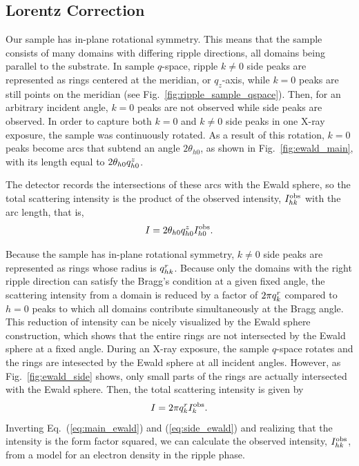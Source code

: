 \subsection{Lorentz Correction}\label{sec:Lorentz_correction}
Our sample has in-plane rotational symmetry. This means that the sample 
consists of many domains with differing ripple directions, all domains
being parallel to the substrate.  
In sample $q$-space, ripple $k\neq 0$ side peaks are represented as rings 
centered at the meridian, or $q_z$-axis, 
while $k=0$ peaks are still points on the meridian 
(see Fig.~\ref{fig:ripple_sample_qspace}). 
Then, for an arbitrary incident angle, $k=0$ peaks are not observed
while side peaks are observed. 
In order to capture both $k=0$ and $k\neq 0$ side peaks in one X-ray exposure, 
the sample was continuously rotated. As a result of this rotation, 
$k=0$ peaks become arcs that subtend an angle $2\theta_{h0}$,
as shown in Fig.~\ref{fig:ewald_main}, with its length
equal to $2\theta_{h0}q_{h0}^z$.  

The detector records the intersections of these arcs with the 
Ewald sphere, so the total scattering intensity is the product of the observed intensity,
$I_{hk}^\mathrm{obs}$ with the arc length, that is, 
\begin{equation}
  I = 2\theta_{h0}q_{h0}^z I_{h0}^\mathrm{obs}. \label{eq:main_ewald}
\end{equation}

Because the sample has in-plane rotational symmetry, $k\neq 0$
side peaks are represented as
rings whose radius is $q_{hk}^r$. 
Because only the domains
with the right ripple direction can satisfy the Bragg's condition at a given fixed
angle, the scattering intensity from a domain is reduced by 
a factor of $2\pi q_{k}^r$ compared to $h=0$ peaks to which all domains
contribute simultaneously at the Bragg angle.
This reduction of intensity can be nicely visualized by the Ewald sphere construction,
which shows that the entire rings are not intersected by the Ewald sphere at 
a fixed angle.  
During an X-ray exposure, the sample $q$-space rotates and 
the rings are intesected by the Ewald sphere at all incident angles.
However, as Fig.~\ref{fig:ewald_side} shows, only small parts of the rings
are actually intersected with the Ewald sphere.  
Then, the total scattering intensity is given by
\begin{equation}
  I=2\pi q_{k}^r I_{k}^\mathrm{obs}. \label{eq:side_ewald}
\end{equation}
Inverting Eq.~(\ref{eq:main_ewald}) and (\ref{eq:side_ewald}) 
and realizing that the intensity is the form factor
squared, we can calculate the observed intensity, $I_{hk}^\mathrm{obs}$, 
from a model for an electron density in the ripple phase.

